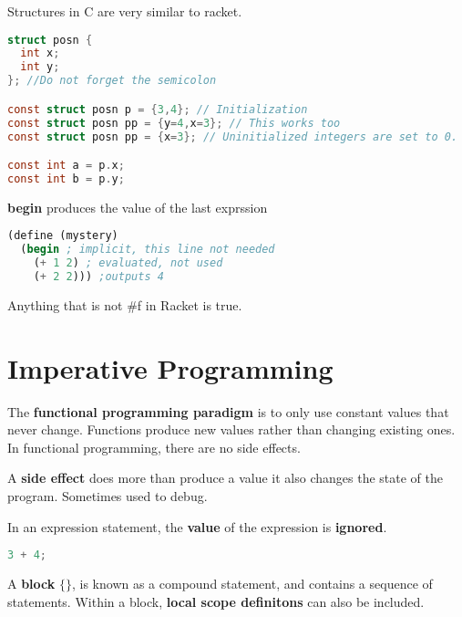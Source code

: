 \documentclass[english, 12pt]{article}
\begin{document}
\begin{defn}
Structures in C are very similar to racket.
\begin{lstlisting}[language=C]
struct posn {
  int x;
  int y;
}; //Do not forget the semicolon

const struct posn p = {3,4}; // Initialization
const struct posn pp = {y=4,x=3}; // This works too
const struct posn pp = {x=3}; // Uninitialized integers are set to 0.

const int a = p.x;
const int b = p.y;
\end{lstlisting}
\end{defn}


\begin{defn}
\textbf{begin} produces the value of the last exprssion
\begin{lstlisting}[language=Scheme]
(define (mystery)
  (begin ; implicit, this line not needed
    (+ 1 2) ; evaluated, not used
    (+ 2 2))) ;outputs 4
\end{lstlisting}
\end{defn}
\begin{qte}
Anything that is not \#f in Racket is true.
\end{qte}
\section{Imperative Programming}
\begin{defn}
The \textbf{functional programming paradigm} is to only use constant values that never change. Functions produce new values rather than changing existing ones. In functional programming, there are no side effects.
\end{defn}

\begin{defn}
A \textbf{side effect} does more than produce a value it also changes the state of the program. Sometimes used to debug.
\end{defn}

\begin{defn}
In an expression statement, the \textbf{value} of the expression is \textbf{ignored}.
\begin{lstlisting}[language=C]
3 + 4;
\end{lstlisting}
\end{defn}

\begin{defn}
A \textbf{block} $\{\}$, is known as a compound statement, and contains a sequence of statements.  Within a block, \textbf{local scope definitons} can also be included.
\end{defn}
\end{document}
